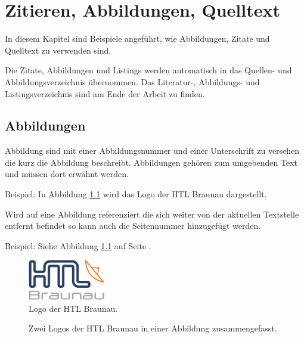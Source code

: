 \chapter{Zitieren, Abbildungen, Quelltext}

In diesem Kapitel sind Beispiele angeführt, wie Abbildungen, Zitate und Quelltext zu verwenden sind.

Die Zitate, Abbildungen und Listings werden automatisch in das Quellen- und Abbildungsverzeichnis übernommen. 
Das Literatur-, Abbildungs- und Listingsverzeichnis sind am Ende der Arbeit zu finden.   

\section{Abbildungen}\label{ref:abbildungen}

Abbildung sind mit einer Abbildungsnummer und einer Unterschrift zu versehen die kurz die Abbildung beschreibt. 
Abbildungen gehören zum umgebenden Text und müssen dort erwähnt werden.

Beispiel: In Abbildung \ref{htl01} wird das Logo der HTL Braunau dargestellt.

Wird auf eine Abbildung referenziert die sich weiter von der aktuellen Textstelle entfernt befindet so kann auch die Seitennummer hinzugefügt werden.

Beispiel: Siehe Abbildung \ref{htl01} auf Seite \pageref{htl01}.


\begin{figure}[H]
	\centering
	\includegraphics[width=0.3\textwidth]{./media/images/htl_c_cmyk_rein.pdf}
  	\caption{Logo der HTL Braunau.}
  	\label{htl01}
\end{figure}



\begin{figure}[H]
  \centering
  \qquad
  \label{fig:canvas_01}
  \caption[Zwei Logos der HTL Braunau]{Zwei Logos der HTL Braunau in einer Abbildung zusammengefasst.}
\end{figure}


